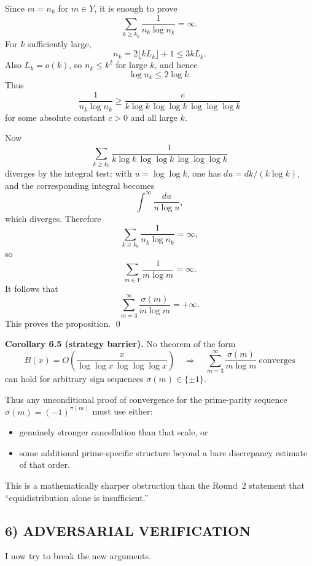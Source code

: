 Since \(m=n_k\) for \(m\in Y\), it is enough to prove
\[
\sum_{k\ge k_0} \frac{1}{n_k\log n_k}=\infty.
\]
For \(k\) sufficiently large,
\[
n_k = 2\lfloor kL_k\rfloor + 1 \le 3kL_k.
\]
Also \(L_k=o(k)\), so \(n_k\le k^2\) for large \(k\), and hence
\[
\log n_k \le 2\log k.
\]
Thus
\[
\frac{1}{n_k\log n_k}
\ge
\frac{c}{k\log k\,\log\log k\,\log\log\log k}
\]
for some absolute constant \(c>0\) and all large \(k\).

Now
\[
\sum_{k\ge k_0}
\frac{1}{k\log k\,\log\log k\,\log\log\log k}
\]
diverges by the integral test:
with \(u=\log\log k\), one has \(du = dk/(k\log k)\), and the corresponding integral becomes
\[
\int^\infty \frac{du}{u\log u},
\]
which diverges.
Therefore
\[
\sum_{k\ge k_0} \frac{1}{n_k\log n_k}=\infty,
\]
so
\[
\sum_{m\in Y}\frac{1}{m\log m}=\infty.
\]
It follows that
\[
\sum_{m=3}^\infty \frac{\sigma(m)}{m\log m}=+\infty.
\]
This proves the proposition. \qed

\medskip

\textbf{Corollary 6.5 (strategy barrier).}
No theorem of the form
\[
B(x)=O\!\left(\frac{x}{\log\log x\,\log\log\log x}\right)
\quad\Longrightarrow\quad
\sum_{m=3}^\infty \frac{\sigma(m)}{m\log m}\ \text{converges}
\]
can hold for arbitrary sign sequences \(\sigma(m)\in\{\pm1\}\).

Thus any unconditional proof of convergence for the prime-parity sequence \(\sigma(m)=(-1)^{\pi(m)}\) must use either:

\begin{itemize}
\item genuinely stronger cancellation than that scale, or
\item some additional prime-specific structure beyond a bare discrepancy estimate of that order.
\end{itemize}

This is a mathematically sharper obstruction than the Round~2 statement that ``equidistribution alone is insufficient.''

\subsection*{6) ADVERSARIAL VERIFICATION}

I now try to break the new arguments.

